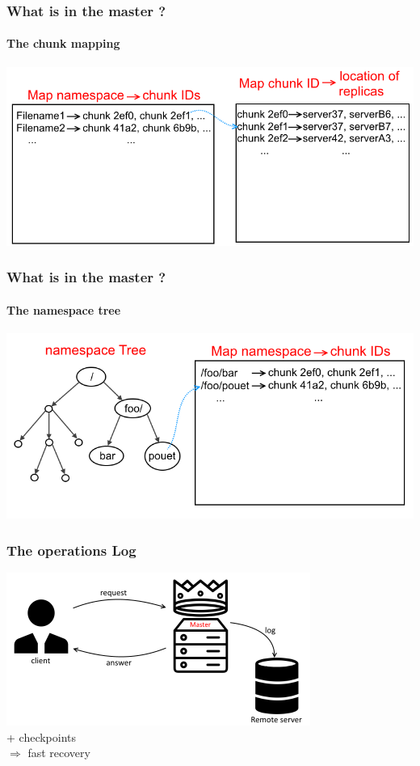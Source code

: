 \documentclass{beamer}
\begin{document}
\begin{frame}
 \frametitle{What is in the master ?}
 \framesubtitle{The chunk mapping}
 \centering
 \includegraphics[height=\masterpicheight]{figures/namespaceMapMapschema.png}
\end{frame}

\begin{frame}
 \frametitle{What is in the master ?}
 \framesubtitle{The namespace tree}
 \centering
 \includegraphics[height=\masterpicheight]{figures/namespaceTreeMapschema.png}
\end{frame}

\begin{frame}
 \frametitle{The operations Log}
 \begin{center}
 \includegraphics[height=5cm]{figures/logschema.png}
 \\\alert{+ checkpoints}\\
 $\Rightarrow$ fast recovery
 \end{center}
\end{frame}
\end{document}
